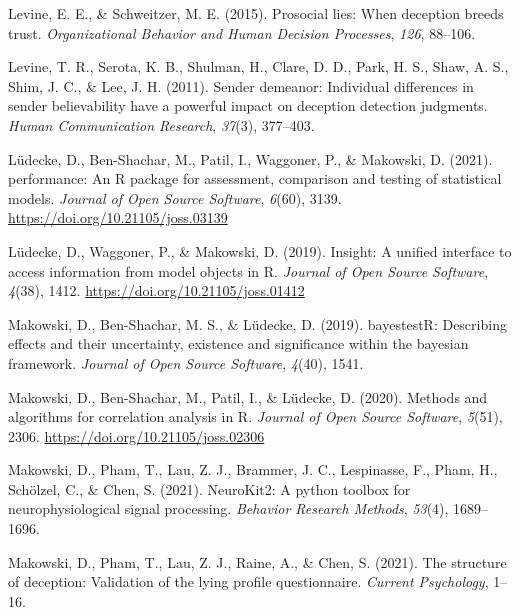 \documentclass[
  man,mask,floatsintext]{apa6}
\newlength{\cslhangindent}
\newlength{\cslentryspacingunit} %
\newenvironment{CSLReferences}[2] %
 {%
  \setlength{\parindent}{0pt}
  \ifodd #1
  \let\oldpar\par
  \def\par{\hangindent=\cslhangindent\oldpar}
  \fi
  \setlength{\parskip}{#2\cslentryspacingunit}
 }%
 {}
\begin{document}
\begin{CSLReferences}{1}{0}
\leavevmode{}%
Levine, E. E., \& Schweitzer, M. E. (2015). Prosocial lies: When deception breeds trust. \emph{Organizational Behavior and Human Decision Processes}, \emph{126}, 88--106.

\leavevmode{}%
Levine, T. R., Serota, K. B., Shulman, H., Clare, D. D., Park, H. S., Shaw, A. S., Shim, J. C., \& Lee, J. H. (2011). Sender demeanor: Individual differences in sender believability have a powerful impact on deception detection judgments. \emph{Human Communication Research}, \emph{37}(3), 377--403.

\leavevmode{}%
Lüdecke, D., Ben-Shachar, M., Patil, I., Waggoner, P., \& Makowski, D. (2021). {performance}: An {R} package for assessment, comparison and testing of statistical models. \emph{Journal of Open Source Software}, \emph{6}(60), 3139. \url{https://doi.org/10.21105/joss.03139}

\leavevmode{}%
Lüdecke, D., Waggoner, P., \& Makowski, D. (2019). Insight: A unified interface to access information from model objects in {R}. \emph{Journal of Open Source Software}, \emph{4}(38), 1412. \url{https://doi.org/10.21105/joss.01412}

\leavevmode{}%
Makowski, D., Ben-Shachar, M. S., \& Lüdecke, D. (2019). bayestestR: Describing effects and their uncertainty, existence and significance within the bayesian framework. \emph{Journal of Open Source Software}, \emph{4}(40), 1541.

\leavevmode{}%
Makowski, D., Ben-Shachar, M., Patil, I., \& Lüdecke, D. (2020). Methods and algorithms for correlation analysis in {R}. \emph{Journal of Open Source Software}, \emph{5}(51), 2306. \url{https://doi.org/10.21105/joss.02306}

\leavevmode{}%
Makowski, D., Pham, T., Lau, Z. J., Brammer, J. C., Lespinasse, F., Pham, H., Schölzel, C., \& Chen, S. (2021). NeuroKit2: A python toolbox for neurophysiological signal processing. \emph{Behavior Research Methods}, \emph{53}(4), 1689--1696.

\leavevmode{}%
Makowski, D., Pham, T., Lau, Z. J., Raine, A., \& Chen, S. (2021). The structure of deception: Validation of the lying profile questionnaire. \emph{Current Psychology}, 1--16.


\end{CSLReferences}
\end{document}
